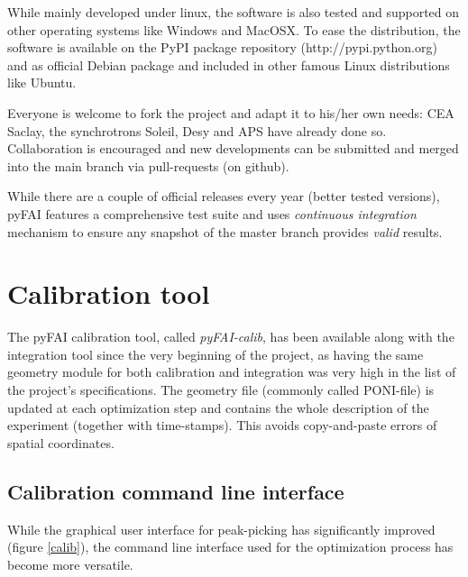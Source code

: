 \documentclass{iucr}
\begin{document}
While mainly developed under linux, the software is also tested and supported on
other operating systems like Windows and MacOSX.
To ease the distribution, the software is available on the PyPI package
repository (http://pypi.python.org) and as official Debian package and included
in other famous Linux distributions like Ubuntu.

Everyone is welcome to fork the project and adapt it to his/her own needs:
CEA Saclay, the synchrotrons Soleil, Desy and APS have already done so.
Collaboration is encouraged and new developments can be submitted and merged
into the main branch via pull-requests (on github).

While there are a couple of official releases every year (better
tested versions), pyFAI features a comprehensive test suite and uses
\textit{continuous integration} mechanism to ensure any snapshot of the master
branch provides \textit{valid} results.

\section{Calibration tool}
\label{annex_calib}

The pyFAI calibration tool, called \textit{pyFAI-calib}, has been available
along with the integration tool since the very beginning of the project, as having
the same geometry module for both calibration and integration was very high in
the list of the project's specifications.
The geometry file (commonly called PONI-file) is updated at each optimization
step and contains the whole description of the experiment (together with
time-stamps).
This avoids copy-and-paste errors of spatial coordinates.

\subsection{Calibration command line interface}

While the graphical user interface for peak-picking has significantly improved
(figure \ref{calib}), the command line interface used for the optimization
process has become more versatile.
\end{document}
